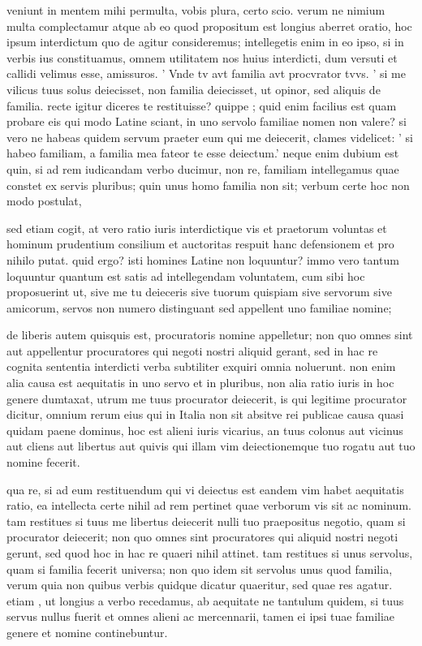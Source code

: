  veniunt in mentem mihi permulta, vobis plura, certo scio. verum ne nimium multa complectamur atque ab eo quod propositum est longius aberret oratio, hoc ipsum interdictum quo de agitur consideremus; intellegetis enim in eo ipso, si in verbis ius constituamus, omnem utilitatem nos huius interdicti, dum versuti et callidi velimus esse, amissuros. ' Vnde tv avt familia avt procvrator tvvs. ' si me vilicus tuus solus deiecisset, non familia deiecisset, ut opinor, sed aliquis de familia. recte igitur diceres te restituisse? quippe ; quid enim facilius est quam probare eis qui modo Latine sciant, in uno servolo familiae nomen non valere? si vero ne habeas quidem servum praeter eum qui me deiecerit, clames videlicet: ' si habeo familiam, a familia mea fateor te esse deiectum.' neque enim dubium est quin, si ad rem iudicandam verbo ducimur, non re, familiam intellegamus quae constet ex servis pluribus; quin unus homo familia non sit; verbum certe hoc non modo postulat,

 sed etiam cogit, at vero ratio iuris interdictique vis et praetorum voluntas et hominum prudentium consilium et auctoritas respuit hanc defensionem et pro nihilo putat. quid ergo? isti homines Latine non loquuntur? immo vero tantum loquuntur quantum est satis ad intellegendam voluntatem, cum sibi hoc proposuerint ut, sive me tu deieceris sive tuorum quispiam sive servorum sive amicorum, servos non numero distinguant sed appellent uno familiae nomine;

 de liberis autem quisquis est, procuratoris nomine appelletur; non quo omnes sint aut appellentur procuratores qui negoti nostri aliquid gerant, sed in hac re cognita sententia interdicti verba subtiliter exquiri omnia noluerunt. non enim alia causa est aequitatis in uno servo et in pluribus, non alia ratio iuris in hoc genere dumtaxat, utrum me tuus procurator deiecerit, is qui legitime procurator dicitur, omnium rerum eius qui in Italia non sit absitve rei publicae causa quasi quidam paene dominus, hoc est alieni iuris vicarius, an tuus colonus aut vicinus aut cliens aut libertus aut quivis qui illam vim deiectionemque tuo rogatu aut tuo nomine fecerit.

 qua re, si ad eum restituendum qui vi deiectus est eandem vim habet aequitatis ratio, ea intellecta certe nihil ad rem pertinet quae verborum vis sit ac nominum. tam restitues si tuus me libertus deiecerit nulli tuo praepositus negotio, quam si procurator deiecerit; non quo omnes sint procuratores qui aliquid nostri negoti gerunt, sed quod hoc in hac re quaeri nihil attinet. tam restitues si unus servolus, quam si familia fecerit universa; non quo idem sit servolus unus quod familia, verum quia non quibus verbis quidque dicatur quaeritur, sed quae res agatur. etiam , ut longius a verbo recedamus, ab aequitate ne tantulum quidem, si tuus servus nullus fuerit et omnes alieni ac mercennarii, tamen ei ipsi tuae familiae genere et nomine continebuntur.

